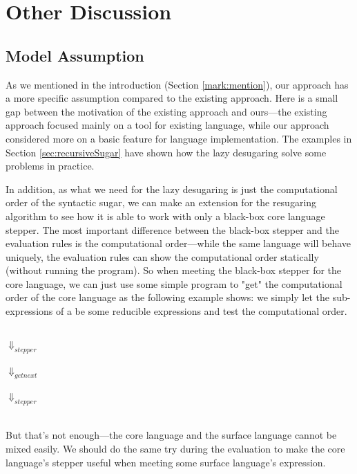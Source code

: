 \section{Other Discussion}
\label{sec5}

\subsection{Model Assumption}
\label{sec5.1}


As we mentioned in the introduction (Section \ref{mark:mention}), our approach has a more specific assumption compared to the existing approach. Here is a small gap between the motivation of the existing approach and ours---the existing approach focused mainly on a tool for existing language, while our approach considered more on a basic feature for language implementation. The examples in Section \ref{sec:recursiveSugar} have shown how the lazy desugaring solve some problems in practice.

In addition, as what we need for the lazy desugaring is just the computational order of the syntactic sugar, we can make an extension for the resugaring algorithm to see how it is able to work with only a black-box core language stepper. The most important difference between the black-box stepper and the evaluation rules is the computational order---while the same language will behave uniquely, the evaluation rules can show the computational order statically (without running the program). So when meeting the black-box stepper for the core language, we can just use some simple program to "get" the computational order of the core language as the following example  shows: we simply let the sub-expressions of a  be some reducible expressions and test the computational order. 

\begin{center}\footnotesize
	\\ $\Downarrow_{stepper}$\\ \\ $\Downarrow_{getnext}$\\ \\ $\Downarrow_{stepper}$\\ \\
\end{center}


But that's not enough---the core language and the surface language cannot be mixed easily. We should do the same try during the evaluation to make the core language's stepper useful when meeting some surface language's expression.

